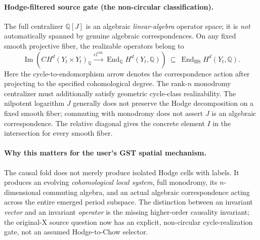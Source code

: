 \documentclass[11pt]{article}
\begin{document}
\paragraph{Hodge-filtered source gate (the non-circular classification).}
The full centralizer $\mathbb Q[J]$ is an algebraic
\emph{linear-algebra} operator space; it is \emph{not}
automatically spanned by genuine algebraic correspondences.
On any fixed smooth projective fiber, the realizable
operators belong to
\[
  \boxed{
  \operatorname{Im}\!\left(
    CH^{d}(Y_t\times Y_t)_{\mathbb Q}
    \xrightarrow{\mathrm{cl}^{\mathrm{can}}}
       \operatorname{End}_{\mathbb Q}H^{d}(Y_t,\mathbb Q)
  \right)
  \ \subseteq\ \operatorname{End}_{\mathrm{HS}}H^{d}(Y_t,\mathbb Q).
  }\tag{C3}
\]
Here the cycle-to-endomorphism arrow denotes the
correspondence action after projecting to the specified
cohomological degree.  The rank-$n$ monodromy centralizer
must additionally satisfy geometric cycle-class
realizability.  The nilpotent logarithm $J$ generally
does not preserve the Hodge decomposition on a
fixed smooth fiber; commuting with monodromy does
not assert $J$ is an algebraic correspondence.
The relative diagonal gives the concrete element
$I$ in the intersection for every smooth fiber.

\paragraph{Why this matters for the user's GST spatial mechanism.}
The causal fold does not merely produce isolated
Hodge cells with labels. It produces an evolving
\emph{cohomological local system}, full monodromy,
its $n$-dimensional commuting algebra, and an
actual algebraic correspondence acting across
the entire emerged period subspace. The distinction
between an invariant \emph{vector} and an invariant
\emph{operator} is the missing higher-order
causality invariant; the original-X source
question now has an explicit, non-circular
cycle-realization gate, not an assumed
Hodge-to-Chow selector.
\end{document}

